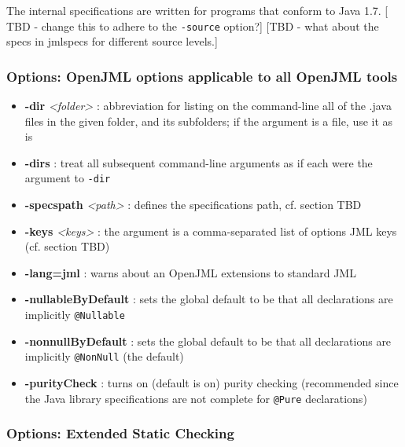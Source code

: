 The internal specifications are written for programs that conform to Java 1.7.  [ TBD - change this to adhere to the {\tt -source} option?] 
[TBD - what about the specs in jmlspecs for different source levels.]

\subsubsection{Options: OpenJML options applicable to all OpenJML tools }
\label{OptionsJML}

\begin{itemize}
\item \textbf{-dir} \textit{<folder>} : abbreviation for listing on the command-line all of the .java files in the given folder, and its subfolders; if the argument is a file, use it as is
\item \textbf{-dirs} : treat all subsequent command-line arguments as if each were the argument to \texttt{-dir}
\item \textbf{-specspath} \textit{<path>} : defines the specifications path, cf. section TBD
\item \textbf{-keys} \textit{<keys>} : the argument is a comma-separated list of options JML keys (cf. section TBD)
\item \textbf{-lang=jml} : warns about an OpenJML extensions to standard JML
\end{itemize}

\begin{itemize}
\item \textbf{-nullableByDefault} : sets the global default to be that all declarations are implicitly \texttt{@Nullable}
\item \textbf{-nonnullByDefault} : sets the global default to be that all 
declarations are implicitly \texttt{@NonNull} (the default)
\item \textbf{-purityCheck} : turns on (default is on) purity checking (recommended since the Java library specifications are not complete for \texttt{@Pure} declarations)
\end{itemize}

\subsubsection{Options: Extended Static Checking}
\label{OptionsESC}

